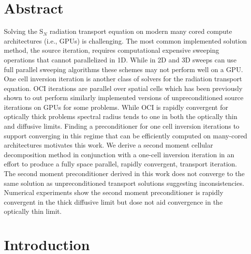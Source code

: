 \section*{Abstract}
Solving the S$_N$ radiation transport equation on modern many cored compute architectures (i.e., GPUs) is challenging.
The most common implemented solution method, the source iteration, requires computational expensive sweeping operations that cannot parallelized in 1D.
While in 2D and 3D sweeps can use full parallel sweeping algorithms these schemes may not perform well on a GPU.
One cell inversion iteration is another class of solvers for the radiation transport equation.
OCI iterations are parallel over spatial cells which has been previously shown to out perform similarly implemented versions of unpreconditioned source iterations on GPUs for some problems.
While OCI is rapidly convergent for optically thick problems spectral radius tends to one in both the optically thin and diffusive limits.
Finding a preconditioner for one cell inversion iterations to support converging in this regime that can be efficiently computed on many-cored architectures motivates this work.
We derive a second moment cellular decomposition method in conjunction with a one-cell inversion iteration in an effort to produce a fully space parallel, rapidly convergent, transport iteration.
The second moment preconditioner derived in this work does not converge to the same solution as unpreconditioned transport solutions suggesting inconsistencies.
Numerical experiments show the second moment preconditioner is rapidly convergent in the thick diffusive limit but dose not aid convergence in the optically thin limit.

\section{Introduction}

